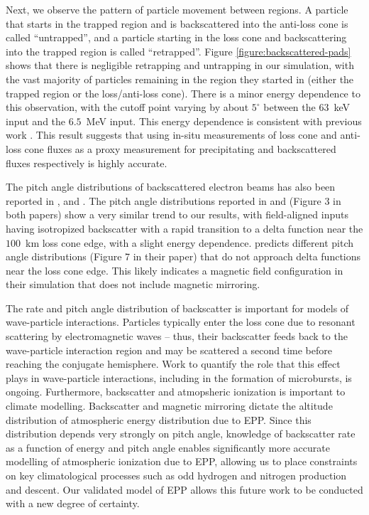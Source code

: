 \documentclass[draft]{agujournal2019}
\newcommand{\mathdeg}{^\circ}
\begin{document}
Next, we observe the pattern of particle movement between regions. A particle that starts in the trapped region and is backscattered into the anti-loss cone is called ``untrapped'', and a particle starting in the loss cone and backscattering into the trapped region is called ``retrapped''. Figure \ref{figure:backscattered-pads} shows that there is negligible retrapping and untrapping in our simulation, with the vast majority of particles remaining in the region they started in (either the trapped region or the loss/anti-loss cone). There is a minor energy dependence to this observation, with the cutoff point varying by about $5\mathdeg$ between the $63$~keV input and the $6.5$~MeV input. This energy dependence is consistent with previous work \cite{marshall2018}. This result suggests that using in-situ measurements of loss cone and anti-loss cone fluxes as a proxy measurement for precipitating and backscattered fluxes respectively is highly accurate.

The pitch angle distributions of backscattered electron beams has also been reported in , and . The pitch angle distributions reported in  and  (Figure 3 in both papers) show a very similar trend to our results, with field-aligned inputs having isotropized backscatter with a rapid transition to a delta function near the $100$~km loss cone edge, with a slight energy dependence.  predicts different pitch angle distributions (Figure 7 in their paper) that do not approach delta functions near the loss cone edge. This likely indicates a magnetic field configuration in their simulation that does not include magnetic mirroring.

The rate and pitch angle distribution of backscatter is important for models of wave-particle interactions. Particles typically enter the loss cone due to resonant scattering by electromagnetic waves -- thus, their backscatter feeds back to the wave-particle interaction region and may be scattered a second time before reaching the conjugate hemisphere. Work to quantify the role that this effect plays in wave-particle interactions, including in the formation of microbursts, is ongoing. Furthermore, backscatter and atmopsheric ionization is important to climate modelling. Backscatter and magnetic mirroring dictate the altitude distribution of atmospheric energy distribution due to EPP. Since this distribution depends very strongly on pitch angle, knowledge of backscatter rate as a function of energy and pitch angle enables significantly more accurate modelling of atmospheric ionization due to EPP, allowing us to place constraints on key climatological processes such as odd hydrogen and nitrogen production and descent. Our validated model of EPP allows this future work to be conducted with a new degree of certainty.
\end{document}
